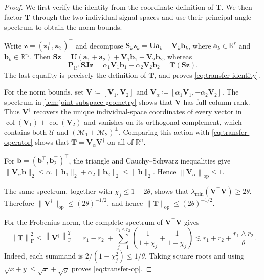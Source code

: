 \documentclass[11pt]{article}
\newcommand{\R}{\mathbb{R}}
\newcommand{\trans}{\top}
\DeclareMathOperator{\col}{col}
\newcommand{\opn}[1]{\left\lVert #1\right\rVert_{\mathrm{op}}}
\newcommand{\frn}[1]{\left\lVert #1\right\rVert_{\mathrm{F}}}
\newcommand{\cU}{\mathcal{U}}
\newcommand{\cM}{\mathcal{M}}
\begin{document}
\begin{proof}
We first verify the identity from the coordinate definition of $\bm T$.  We
then factor $\bm T$ through the two individual signal spaces and use their
principal-angle spectrum to obtain the norm bounds.

Write $\bm z=(\bm z_1^\trans,\bm z_2^\trans)^\trans$ and decompose
$\bm S_k\bm z_k=\bm U\bm a_k+\bm V_k\bm b_k$, where
$\bm a_k\in\R^r$ and $\bm b_k\in\R^{r_k}$.  Then
$\bm S\bm z=\bm U(\bm a_1+\bm a_2)+\bm V_1\bm b_1+\bm V_2\bm b_2$, whereas
\[
  \bm P_{\cU^\perp}\bm S\bm J\bm z
  =
  \alpha_1\bm V_1\bm b_1
  -
  \alpha_2\bm V_2\bm b_2
  =
  \bm T(\bm S\bm z).
\]
The last equality is precisely the definition of $\bm T$, and proves
\cref{eq:transfer-identity}.


For the norm bounds, set
$\bm V\coloneqq[\bm V_1,\bm V_2]$ and
$\bm V_\alpha\coloneqq[\alpha_1\bm V_1,-\alpha_2\bm V_2]$.
The spectrum in \cref{lem:joint-subspace-geometry} shows that $\bm V$ has
full column rank. Thus $\bm V^\dagger$ recovers the unique individual-space
coordinates of every vector in
$\col(\bm V_1)+\col(\bm V_2)$ and vanishes on its orthogonal complement,
which contains both $\cU$ and $(\cM_1+\cM_2)^\perp$. Comparing this action
with \cref{eq:transfer-operator} shows that
$\bm T=\bm V_\alpha\bm V^\dagger$ on all of $\mathbb R^n$.

For $\bm b=(\bm b_1^\trans,\bm b_2^\trans)^\trans$, the triangle and
Cauchy--Schwarz inequalities give
$\|\bm V_\alpha\bm b\|_2
\le\alpha_1\|\bm b_1\|_2+\alpha_2\|\bm b_2\|_2
\le\|\bm b\|_2$.
Hence $\opn{\bm V_\alpha}\le1$.






The same spectrum, together with
$\chi_j\le1-2\theta$, shows that
$\lambda_{\min}(\bm V^\trans\bm V)\ge2\theta$.  Therefore
$\|\bm V^\dagger\|_{\mathrm{op}}\le(2\theta)^{-1/2}$, and hence
$\|\bm T\|_{\mathrm{op}}\le(2\theta)^{-1/2}$.

For the Frobenius norm, the complete spectrum of
$\bm V^\trans\bm V$ gives
\[
  \frn{\bm T}^2
  \le
  \frn{\bm V^\dagger}^2
  =
  |r_1-r_2|
  +
  \sum_{j=1}^{r_1 \wedge r_2}
  \left(
    \frac{1}{1+\chi_j}
    +
    \frac{1}{1-\chi_j}
  \right)
  \lesssim
  r_1+r_2+\frac{r_1 \wedge r_2}{\theta}.
\]
Indeed, each summand is
$2/(1-\chi_j^2)\le1/\theta$.  Taking square roots and using
$\sqrt{x+y}\le\sqrt x+\sqrt y$ proves \cref{eq:transfer-op}.
\end{proof}
\end{document}
